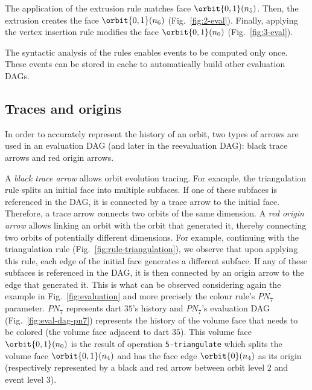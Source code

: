 
The %
application of the extrusion rule
matches face $\orbit{0,1}(n_{5})$. Then, the ex\-tru\-sion creates the face $\orbit{0,1}(n_{6})$ (Fig.~\ref{fig:2-eval}).
Finally, %
applying the vertex insertion rule
modifies the face $\orbit{0,1}(n_{0})$ (Fig.~\ref{fig:3-eval}). %

The syntactic analysis of the rules enables events to be computed only once. These events can be stored in cache to automatically build other evaluation DAGs.

\subsection{Traces and origins}

In order to accurately represent the history of an orbit, two types of arrows are used in an evaluation DAG (and later in the reevaluation DAG): black trace arrows and red origin arrows. 

A \emph{black trace arrow} allows orbit evolution tracing. For example, the triangulation rule splits an initial face into multiple subfaces. If one of these subfaces is referenced in the DAG, it is connected by a trace arrow to the initial face. Therefore, a trace arrow connects two orbits of the same dimension.
A \emph{red origin arrow} allows lin\-king an orbit with the orbit that generated it, thereby connecting two orbits of potentially different dimensions. For example, continuing with the triangulation rule (Fig.~\ref{fig:rule-triangulation}), we observe that upon applying this rule, each edge of the initial face generates a different subface. If any of these subfaces is referenced in the DAG, it is then connected by an origin arrow to the edge that generated it.
This is what can be observed considering again the example in Fig.~\ref{fig:evaluation} and more pre\-ci\-se\-ly the colour rule's $PN_7$ parameter. $PN_7$ represents dart $35$'s history and $PN_7$'s evaluation DAG (Fig.~\ref{fig:eval-dag-pn7}) represents the history of the volume face that needs to be colored (the volume face ad\-ja\-cent to dart $35$).
This volume face $\orbit{0,1}(n_0)$ is the result of %
operation \verb+5-triangulate+ 
which splits the volume face $\orbit{0,1}(n_4)$ and has the face edge $\orbit{0}(n_4)$ as its origin (respectively represented by a black and red arrow between orbit level 2 and event level 3).

